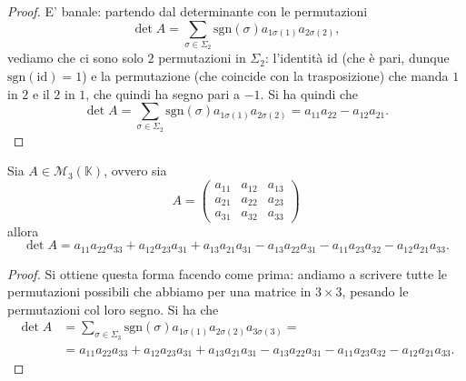 \begin{proof}
    E' banale: partendo dal determinante con le permutazioni
    $$
        \det{A} = \sum_{\sigma \in \Sigma_2} \text{sgn}(\sigma) a_{1\sigma(1)} a_{2 \sigma(2)},
    $$
    vediamo che ci sono solo $2$ permutazioni in $\Sigma_2$: l'identità $\text{id}$ (che è pari, dunque $\text{sgn}(\text{id})=1$) e la permutazione (che coincide con la trasposizione) che manda $1$ in $2$ e il $2$ in $1$, che quindi ha segno pari a $-1$. Si ha quindi che
    $$
        \det{A} = \sum_{\sigma \in \Sigma_2} \text{sgn}(\sigma) a_{1\sigma(1)} a_{2 \sigma(2)} = a_{11} a_{22} - a_{12} a_{21}.
    $$
\end{proof}
\begin{cor}
    Sia $A \in \mathcal{M}_3(\mathbb{K})$, ovvero sia
    $$
        A = \begin{pmatrix}
            a_{11} & a_{12} & a_{13} \\
            a_{21} & a_{22} & a_{23} \\
            a_{31} & a_{32} & a_{33}
        \end{pmatrix}
    $$
    allora
    $$
        \det{A} = a_{11} a_{22} a_{33} + a_{12} a_{23} a_{31} + a_{13} a_{21} a_{31} - a_{13} a_{22} a_{31} - a_{11} a_{23} a_{32} - a_{12} a_{21} a_{33}.
    $$
\end{cor}
\begin{proof}
    Si ottiene questa forma facendo come prima: andiamo a scrivere tutte le permutazioni possibili che abbiamo per una matrice in $3 \times 3$, pesando le permutazioni col loro segno. Si ha che
    \begin{align}
        \det{A} &= \sum_{\sigma \in \Sigma_3} \text{sgn}(\sigma) a_{1 \sigma(1)} a_{2 \sigma(2)} a_{3 \sigma(3)} = \\
        &= a_{11} a_{22} a_{33} + a_{12} a_{23} a_{31} + a_{13} a_{21} a_{31} - a_{13} a_{22} a_{31} - a_{11} a_{23} a_{32} - a_{12} a_{21} a_{33}.
    \end{align}
    \end{proof}
